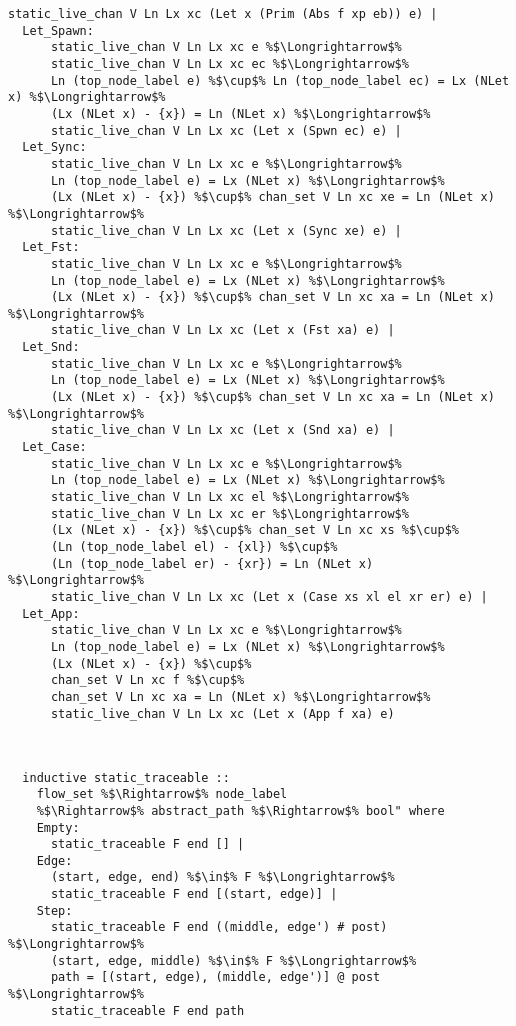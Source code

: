 \documentclass{article}
\begin{document}
\begin{lstlisting}[style=codestyle1, escapechar=\%]
      static_live_chan V Ln Lx xc (Let x (Prim (Abs f xp eb)) e) |
  Let_Spawn:
      static_live_chan V Ln Lx xc e %$\Longrightarrow$%
      static_live_chan V Ln Lx xc ec %$\Longrightarrow$%
      Ln (top_node_label e) %$\cup$% Ln (top_node_label ec) = Lx (NLet x) %$\Longrightarrow$%
      (Lx (NLet x) - {x}) = Ln (NLet x) %$\Longrightarrow$%
      static_live_chan V Ln Lx xc (Let x (Spwn ec) e) |
  Let_Sync:
      static_live_chan V Ln Lx xc e %$\Longrightarrow$%
      Ln (top_node_label e) = Lx (NLet x) %$\Longrightarrow$%
      (Lx (NLet x) - {x}) %$\cup$% chan_set V Ln xc xe = Ln (NLet x) %$\Longrightarrow$%
      static_live_chan V Ln Lx xc (Let x (Sync xe) e) |
  Let_Fst:
      static_live_chan V Ln Lx xc e %$\Longrightarrow$%
      Ln (top_node_label e) = Lx (NLet x) %$\Longrightarrow$%
      (Lx (NLet x) - {x}) %$\cup$% chan_set V Ln xc xa = Ln (NLet x) %$\Longrightarrow$%
      static_live_chan V Ln Lx xc (Let x (Fst xa) e) |
  Let_Snd:
      static_live_chan V Ln Lx xc e %$\Longrightarrow$%
      Ln (top_node_label e) = Lx (NLet x) %$\Longrightarrow$%
      (Lx (NLet x) - {x}) %$\cup$% chan_set V Ln xc xa = Ln (NLet x) %$\Longrightarrow$%
      static_live_chan V Ln Lx xc (Let x (Snd xa) e) |
  Let_Case:
      static_live_chan V Ln Lx xc e %$\Longrightarrow$%
      Ln (top_node_label e) = Lx (NLet x) %$\Longrightarrow$%
      static_live_chan V Ln Lx xc el %$\Longrightarrow$%
      static_live_chan V Ln Lx xc er %$\Longrightarrow$%
      (Lx (NLet x) - {x}) %$\cup$% chan_set V Ln xc xs %$\cup$% 
      (Ln (top_node_label el) - {xl}) %$\cup$%
      (Ln (top_node_label er) - {xr}) = Ln (NLet x) %$\Longrightarrow$%
      static_live_chan V Ln Lx xc (Let x (Case xs xl el xr er) e) |
  Let_App:
      static_live_chan V Ln Lx xc e %$\Longrightarrow$%
      Ln (top_node_label e) = Lx (NLet x) %$\Longrightarrow$%
      (Lx (NLet x) - {x}) %$\cup$%
      chan_set V Ln xc f %$\cup$%
      chan_set V Ln xc xa = Ln (NLet x) %$\Longrightarrow$%
      static_live_chan V Ln Lx xc (Let x (App f xa) e)


  \end{lstlisting}


\begin{lstlisting}[style=codestyle1, escapechar=\%]

  inductive static_traceable ::
    flow_set %$\Rightarrow$% node_label
    %$\Rightarrow$% abstract_path %$\Rightarrow$% bool" where
    Empty:
      static_traceable F end [] |
    Edge:
      (start, edge, end) %$\in$% F %$\Longrightarrow$%
      static_traceable F end [(start, edge)] |
    Step:
      static_traceable F end ((middle, edge') # post) %$\Longrightarrow$%
      (start, edge, middle) %$\in$% F %$\Longrightarrow$%
      path = [(start, edge), (middle, edge')] @ post %$\Longrightarrow$%
      static_traceable F end path

  \end{lstlisting}
\end{document}

